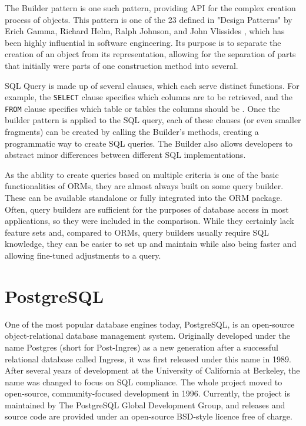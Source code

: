 The Builder pattern is one such pattern, providing API for the complex creation
process of objects. This pattern is one of the 23 defined in "Design Patterns"
by Erich Gamma, Richard Helm, Ralph Johnson, and John Vlissides
\cite{gamma-design-1995}, which has been highly influential in software
engineering. Its purpose is to separate the creation of an object from its
representation, allowing for the separation of parts that initially were parts
of one construction method into several.

SQL Query is made up of several clauses, which each serve distinct functions.
For example, the \texttt{SELECT} clause specifies which columns are to be
retrieved, and the \texttt{FROM} clause specifies which table or tables the
columns should be \cite{postgres-lexer}. Once the builder pattern is applied to
the SQL query, each of these clauses (or even smaller fragments) can be created
by calling the Builder's methods, creating a programmatic way to create SQL
queries. The Builder also allows developers to abstract minor differences
between different SQL implementations.

As the ability to create queries based on multiple criteria is one of the basic
functionalities of ORMs, they are almost always built on some query builder.
These can be available standalone or fully integrated into the ORM package.
Often, query builders are sufficient for the purposes of database access in most
applications, so they were included in the comparison. While they certainly lack
feature sets and, compared to ORMs, query builders usually require SQL
knowledge, they can be easier to set up and maintain while also being faster and
allowing fine-tuned adjustments to a query.

\section*{PostgreSQL}
One of the most popular database engines today, PostgreSQL, is an open-source
object-relational database management system. Originally developed under the
name Postgres \cite{postres-about} (short for Post-Ingres) as a new generation
after a successful relational database called Ingress, it was first released
under this name in 1989. After several years of development at the University of
California at Berkeley, the name was changed to focus on SQL compliance. The
whole project moved to open-source, community-focused development in 1996.
Currently, the project is maintained by The PostgreSQL Global Development Group,
and releases and source code are provided under an open-source BSD-style licence
free of charge.

